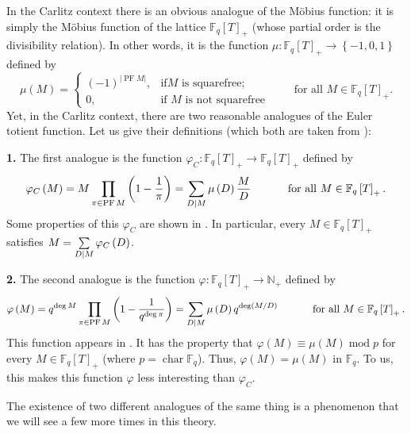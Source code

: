 \documentclass[numbers=enddot,12pt,final,onecolumn,notitlepage]{scrartcl}%
\theoremstyle{definition}
\let\sumnonlimits\sum
\let\prodnonlimits\prod
\renewcommand{\sum}{\sumnonlimits\limits}
\renewcommand{\prod}{\prodnonlimits\limits}
\begin{document}
In the Carlitz context there is an obvious analogue of the M\"{o}bius
function: it is simply the M\"{o}bius function of the lattice $\mathbb{F}%
_{q}\left[  T\right]  _{+}$ (whose partial order is the divisibility
relation). In other words, it is the function $\mu:\mathbb{F}_{q}\left[
T\right]  _{+}\rightarrow\left\{  -1,0,1\right\}  $ defined by%
\[
\mu\left(  M\right)  =%
\begin{cases}
\left(  -1\right)  ^{\left\vert \operatorname*{PF}M\right\vert }, & \text{if
}M\text{ is squarefree;}\\
0, & \text{if }M\text{ is not squarefree}%
\end{cases}
\ \ \ \ \ \ \ \ \ \ \text{for all }M\in\mathbb{F}_{q}\left[  T\right]  _{+}.
\]
Yet, in the Carlitz context, there are two reasonable analogues of the Euler
totient function. Let us give their definitions (which both are taken from
\cite{kc-carlitz}):

\textbf{1.} The first analogue is the function $\varphi_{C}:\mathbb{F}%
_{q}\left[  T\right]  _{+}\rightarrow\mathbb{F}_{q}\left[  T\right]  _{+}$
defined by%
\[
\varphi_{C}\left(  M\right)  =M\prod\limits_{\pi\in\operatorname*{PF}M}\left(
1-\dfrac{1}{\pi}\right)  =\sum\limits_{D\mid M}\mu\left(  D\right)  \dfrac
{M}{D}\ \ \ \ \ \ \ \ \ \ \text{for all }M\in\mathbb{F}_{q}\left[  T\right]
_{+}.
\]
Some properties of this $\varphi_{C}$ are shown in \cite[Theorem
4.5]{kc-carlitz}. In particular, every $M\in\mathbb{F}_{q}\left[  T\right]
_{+}$ satisfies $M=\sum\limits_{D\mid M}\varphi_{C}\left(  D\right)  $.

\textbf{2.} The second analogue is the function $\varphi:\mathbb{F}_{q}\left[
T\right]  _{+}\rightarrow\mathbb{N}_{+}$ defined by%
\[
\varphi\left(  M\right)  =q^{\deg M}\prod\limits_{\pi\in\operatorname*{PF}%
M}\left(  1-\dfrac{1}{q^{\deg\pi}}\right)  =\sum\limits_{D\mid M}\mu\left(
D\right)  q^{\deg\left(  M / D\right)  }\ \ \ \ \ \ \ \ \ \ \text{for all
}M\in\mathbb{F}_{q}\left[  T\right]  _{+}.
\]
This function appears in \cite[Section 6]{kc-carlitz}. It has the property
that $\varphi\left(  M\right)  \equiv\mu\left(  M\right)  \operatorname{mod}p$
for every $M\in\mathbb{F}_{q}\left[  T\right]  _{+}$ (where
$p=\operatorname*{char}\mathbb{F}_{q}$). Thus, $\varphi\left(  M\right)
=\mu\left(  M\right)  $ in $\mathbb{F}_{q}$. To us, this makes this function
$\varphi$ less interesting than $\varphi_{C}$.

The existence of two different analogues of the same thing is a phenomenon
that we will see a few more times in this theory.
\end{document}
